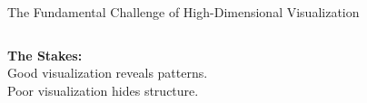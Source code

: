 \documentclass[10pt]{beamer}
\begin{document}
\begin{frame}{The Fundamental Challenge of High-Dimensional Visualization}
\begin{columns}
\begin{column}{0.5\textwidth}
\begin{figure}
\end{figure}

\vspace{0.3cm}
\textbf{The Stakes:}\\
Good visualization reveals patterns.\\
Poor visualization hides structure.
\end{column}
\end{columns}

\end{frame}
\end{document}
